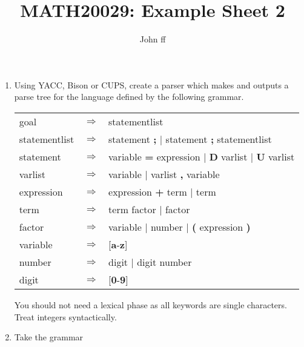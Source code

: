 
\title{ \large \bf MATH20029: Example Sheet 2}
\author{John ff}
\maketitle
\setlength{\parskip}{0.2in}

\vskip -1in

\begin{enumerate}

\item

Using YACC, Bison or CUPS, create a parser which makes and outputs a parse
tree for the language defined by the following grammar.

\begin{tabular}{lcl}
goal & $\Rightarrow$ & statementlist \\
statementlist & $\Rightarrow$ & statement {\bf ;} $|$ statement {\bf ;} statementlist \\
statement & $\Rightarrow$ & variable {\bf =} expression $|$ {\bf D} varlist $|$ {\bf U} varlist \\
varlist & $\Rightarrow$ & variable $|$ varlist {\bf ,} variable \\
expression & $\Rightarrow$ & expression {\bf +} term $|$ term \\
term & $\Rightarrow$ & term {\bf *} factor $|$ factor \\
factor & $\Rightarrow$ & variable $|$  number $|$ {\bf (} expression {\bf )} \\
variable & $\Rightarrow$ & [{\bf a}-{\bf z}] \\
number & $\Rightarrow$ & digit $|$ digit number \\
digit & $\Rightarrow$ & [{\bf 0}-{\bf 9}]
\end{tabular}

 You should not need a lexical phase as all
keywords are single characters.  Treat integers syntactically.

\item Take the grammar 


\end{enumerate}
